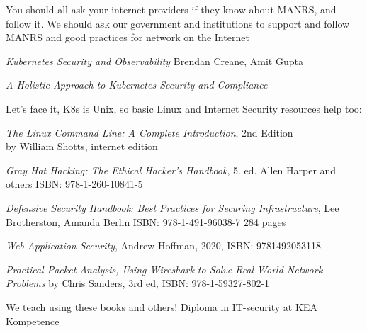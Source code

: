 \documentclass[Screen16to9,17pt]{foils}
\begin{document}
You should all ask your internet providers if they know about MANRS, and follow it. We should ask our government and institutions to support and follow MANRS and good practices for network on the Internet


\begin{list2}


\item \emph{Kubernetes Security and Observability} Brendan Creane, Amit Gupta %

\end{list2}



\begin{list2}
\item
\item \emph{A Holistic Approach to Kubernetes Security and Compliance}\\

\end{list2}


Let's face it, K8s is Unix, so basic Linux and Internet Security resources help too:
\begin{list2}
\item \emph{The Linux Command Line: A Complete Introduction}, 2nd Edition\\
 by William Shotts, internet edition 
\item \emph{Gray Hat Hacking: The Ethical Hacker's Handbook}, 5. ed. Allen Harper and others ISBN: 978-1-260-10841-5
\item \emph{Defensive Security Handbook: Best Practices for Securing Infrastructure}, Lee Brotherston, Amanda Berlin ISBN: 978-1-491-96038-7 284 pages
\item \emph{Web Application Security}, Andrew Hoffman, 2020, ISBN: 9781492053118
\item \emph{Practical Packet Analysis, Using Wireshark to Solve Real-World Network Problems}
by Chris Sanders, 3rd ed, ISBN: 978-1-59327-802-1
\end{list2}

We teach using these books and others! Diploma in IT-security at KEA Kompetence\\
\end{document}
